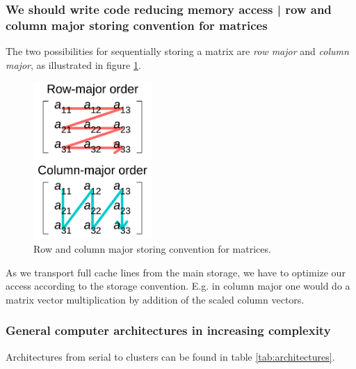 \subsubsection{We should write code reducing memory access | row and column major storing
convention for matrices}
The two possibilities for sequentially storing a matrix are \textit{row major}
and \textit{column major}, as illustrated in figure \ref{fig:row_col_major}.

\begin{figure}
    \centering
    \includegraphics[width=0.4\textwidth]{figures/column_row.pdf}
    \caption{Row and column major storing convention for matrices.}
    \label{fig:row_col_major}
\end{figure}

As we transport full cache lines from the main storage, we have to optimize
our access according to the storage convention. E.g. in column major
one would do a matrix vector multiplication by addition of the scaled
column vectors.

\subsubsection{General computer architectures in increasing complexity\skipthis}

Architectures from serial to clusters can be found in table \ref{tab:architectures}.

